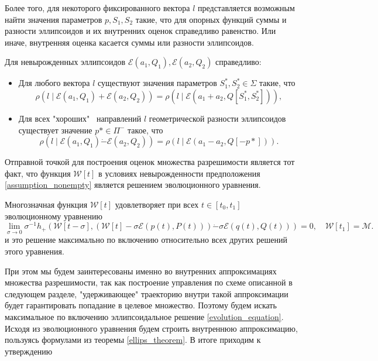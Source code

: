 Более того, для некоторого фиксированного вектора \( l \) представляется возможным найти значения параметров
\( p, S_1, S_2 \) такие, что для опорных функций суммы и разности эллипсоидов и их внутренних оценок справедливо
равенство. Или иначе, внутренняя оценка касается суммы или разности эллипсоидов.

\begin{theorem}
    Для невырожденных эллипсоидов \( \mathcal{E}(a_1, Q_1), \mathcal{E}(a_2, Q_2) \) справедливо:
    \begin{itemize}
        \item Для любого вектора \( l \) существуют значения параметров \( S_1^*, S_2^* \in \Sigma \) такие, что
        \begin{equation*}
            \rho(l \mid \mathcal{E}(a_1, Q_1) + \mathcal{E}(a_2, Q_2)) = \rho(l \mid \mathcal{E}(a_1 + a_2, Q[S_1^*, S_2^*])),
        \end{equation*}
        \item Для всех "хороших" \ направлений \( l \) геометрической разности эллипсоидов существует значение \( p* \in \Pi^- \) такое, что
        \begin{equation*}
            \rho(l \mid \mathcal{E}(a_1, Q_1) \dot{-} \mathcal{E}(a_2, Q_2)) = \rho(l \mid \mathcal{E}(a_1 - a_2, Q[-p*])).
        \end{equation*}
    \end{itemize}
\end{theorem}


Отправной точкой для построения оценок множества разрешимости является тот факт, что функция 
 \( \mathcal{W}[t] \) в условиях невырожденности предположения \eqref{assumption_nonempty} является 
 решением эволюционного уравнения.

\begin{theorem}
    Многозначная функция \( \mathcal{W}[t] \) удовлетворяет при всех \( t \in [t_0, t_1 ]\) 
     эволюционному уравнению
    \begin{equation}\label{evolution_equation}
        \lim_{\sigma \to 0} \sigma^{-1} h_+ \left( \mathcal{W}[t - \sigma], \left( \mathcal{W}[t] - 
         \sigma \mathcal{E}(p(t), P(t)) \right) \dot{-} \sigma \mathcal{E}(q(t), Q(t)) \right) = 0,
         \quad \mathcal{W}[t_1] = \mathcal{M}.
    \end{equation}
    и это решение максимально по включению относительно всех других решений этого уравнения. 
\end{theorem}

При этом мы будем заинтересованы именно во внутренних аппроксимациях множества разрешимости, так как
 построение управления по схеме описанной в следующем разделе, "удерживающее" траекторию внутри такой
 аппроксимации будет гарантировать попадание в целевое множество. Поэтому будем искать максимальное 
 по включению эллипсоидальное решение \eqref{evolution_equation}. Исходя из эволюционного уравнения будем
 строить внутреннюю аппроксимацию, пользуясь формулами из теоремы \eqref{ellips_theorem}. В итоге приходим
 к утверждению

